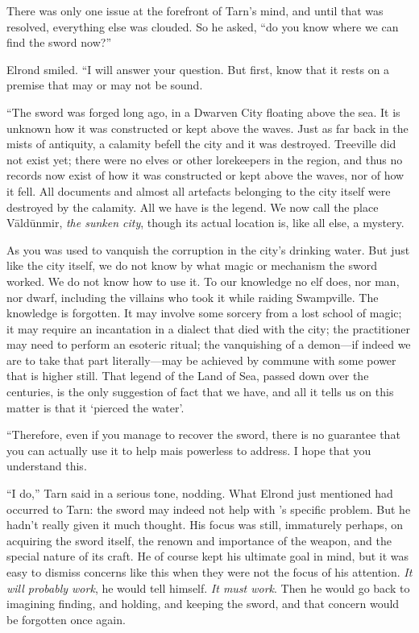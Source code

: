 There was only one issue at the forefront of Tarn's mind, and until that was resolved, everything else was clouded.  So he asked, ``do you know where we can find the sword now?''

Elrond smiled.  ``I will answer your question.  But first, know that it rests on a premise that may or may not be sound.

``The sword \kildir was forged long ago, in a Dwarven City floating above the sea.  It is unknown how it was constructed or kept above the waves.  Just as far back in the mists of antiquity, a calamity befell the city and it was destroyed.  Treeville did not exist yet; there were no elves or other lorekeepers in the region, and thus no records now exist of how it was constructed or kept above the waves, nor of how it fell.  All documents and almost all artefacts belonging to the city itself were destroyed by the calamity.  All we have is the legend.  We now call the place V\=ald\=unmir, \emph{the sunken city}, though its actual location is, like all else, a mystery.

As you \kildir was used to vanquish the corruption in the city's drinking water.  But just like the city itself, we do not know by what magic or mechanism the sword worked.  We do not know how to use it.  To our knowledge no elf does, nor man, nor dwarf, including the villains who took it while raiding Swampville.  The knowledge is forgotten.  It may involve some sorcery from a lost school of magic; it may require an incantation in a dialect that died with the city; the practitioner may need to perform an esoteric ritual; the vanquishing of a demon---if indeed we are to take that part literally---may be achieved by commune with some power that is higher still.  That legend of the Land of Sea, passed down over the centuries, is the only suggestion of fact that we have, and all it tells us on this matter is that it `pierced the water'.

``Therefore, even if you manage to recover the sword, there is no guarantee that you can actually use it to help ma\kildir is powerless to address.  I hope that you understand this.

``I do,'' Tarn said in a serious tone, nodding.  What Elrond just mentioned had occurred to Tarn: the sword may indeed not help with \korbarthrond's specific problem.  But he hadn't really given it much thought.  His focus was still, immaturely perhaps, on acquiring the sword itself, the renown and importance of the weapon, and the special nature of its craft.  He of course kept his ultimate goal in mind, but it was easy to dismiss concerns like this when they were not the focus of his attention.  \emph{It will probably work}, he would tell himself.  \emph{It must work}.  Then he would go back to imagining finding, and holding, and keeping the sword, and that concern would be forgotten once again.

